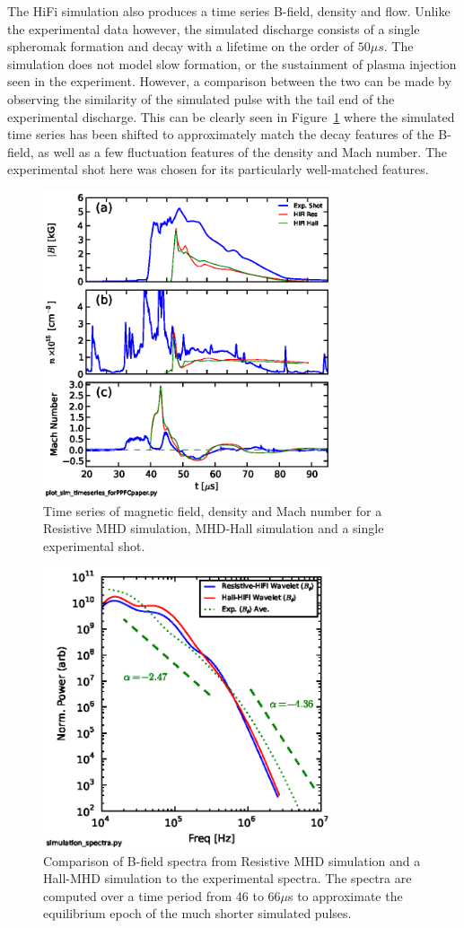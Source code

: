 \documentclass[12pt]{iopart}
\begin{document}
The HiFi simulation also produces a time series B-field, density and flow. Unlike the experimental data however, the simulated discharge consists of a single spheromak formation and decay with a lifetime on the order of $50 \mu s$. The simulation does not model slow formation, or the sustainment of plasma injection seen in the experiment. However, a comparison between the two can be made by observing the similarity of the simulated pulse with the tail end of the experimental discharge. This can be clearly seen in Figure~\ref{fig:simtimeseries64} where the simulated time series has been shifted to approximately match the decay features of the B-field, as well as a few fluctuation features of the density and Mach number. The experimental shot here was chosen for its particularly well-matched features.

\begin{figure}[!htbp]
\centerline{
\includegraphics[width=8.5cm]{simtimeseries64.eps}}
\caption{\label{fig:simtimeseries64} Time series of magnetic field, density and Mach number for a Resistive MHD simulation, MHD-Hall simulation and a single experimental shot.}
\end{figure}
\begin{figure}[!htbp]
\centerline{
\includegraphics[width=8.5cm]{simBspectra.eps}}
\caption{\label{fig:simBspectra} Comparison of B-field spectra from Resistive MHD simulation and a Hall-MHD simulation to the experimental spectra. The spectra are computed over a time period from 46 to 66$\mu$s to approximate the equilibrium epoch of the much shorter simulated pulses.}
\end{figure}
\end{document}
